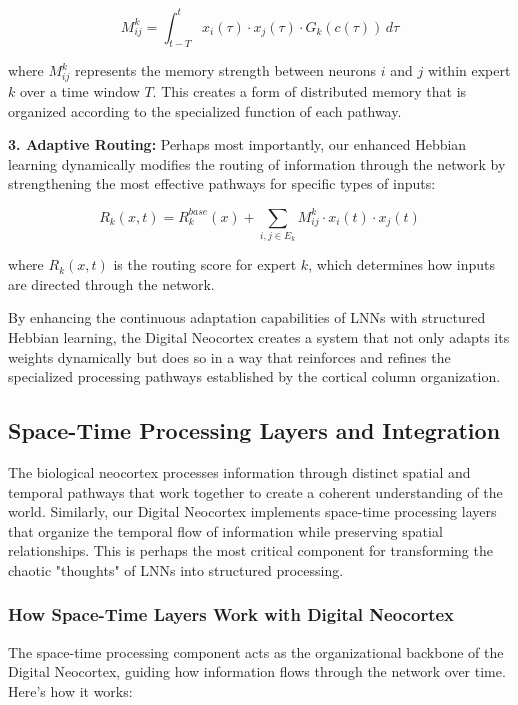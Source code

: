 \documentclass{article}
\begin{document}
\begin{equation}
M_{ij}^k = \int_{t-T}^{t} x_i(\tau) \cdot x_j(\tau) \cdot G_k(c(\tau)) \, d\tau
\end{equation}

where $M_{ij}^k$ represents the memory strength between neurons $i$ and $j$ within expert $k$ over a time window $T$. This creates a form of distributed memory that is organized according to the specialized function of each pathway.

\textbf{3. Adaptive Routing:} Perhaps most importantly, our enhanced Hebbian learning dynamically modifies the routing of information through the network by strengthening the most effective pathways for specific types of inputs:

\begin{equation}
R_k(x, t) = R_k^{base}(x) + \sum_{i,j \in E_k} M_{ij}^k \cdot x_i(t) \cdot x_j(t)
\end{equation}

where $R_k(x, t)$ is the routing score for expert $k$, which determines how inputs are directed through the network.

By enhancing the continuous adaptation capabilities of LNNs with structured Hebbian learning, the Digital Neocortex creates a system that not only adapts its weights dynamically but does so in a way that reinforces and refines the specialized processing pathways established by the cortical column organization.

\subsection{Space-Time Processing Layers and Integration}
The biological neocortex processes information through distinct spatial and temporal pathways that work together to create a coherent understanding of the world. Similarly, our Digital Neocortex implements space-time processing layers that organize the temporal flow of information while preserving spatial relationships. This is perhaps the most critical component for transforming the chaotic "thoughts" of LNNs into structured processing.

\subsubsection{How Space-Time Layers Work with Digital Neocortex}
The space-time processing component acts as the organizational backbone of the Digital Neocortex, guiding how information flows through the network over time. Here's how it works:
\end{document}
